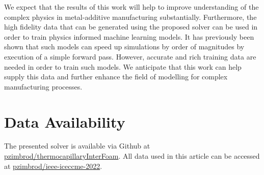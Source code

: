 \documentclass[conference,final]{IEEEtran}
\begin{document}
We expect that the results of this work will help to improve understanding of the complex physics in metal-additive manufacturing substantially. Furthermore, the high fidelity data that can be generated using the proposed solver can be used in order to train physics informed machine learning models. It has previously been shown that such models can speed up simulations by order of magnitudes by execution of a simple forward pass. However, accurate and rich training data are needed in order to train such models. We anticipate that this work can help supply this data and further enhance the field of modelling for complex manufacturing processes.

\section{Data Availability}

The presented solver is available via Github at \href{https://github.com/pzimbrod/thermocapillaryInterFoam}{pzimbrod/thermocapillaryInterFoam}. All data used in this article can be accessed at \href{https://github.com/pzimbrod/ieee-iceccme-2022}{pzimbrod/ieee-iceccme-2022}.



\end{document}
